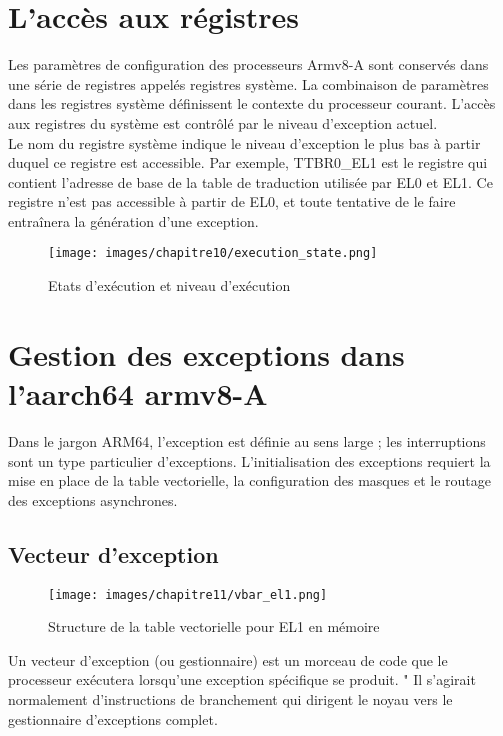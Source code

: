 \documentclass[12pt,a4paper,oneside]{book}
\begin{document}
	
	\section{L'accès aux régistres}
	
	Les paramètres de configuration des processeurs Armv8-A sont conservés dans une série de registres appelés registres système. La combinaison de paramètres dans les registres système définissent le contexte du processeur courant. L'accès aux registres du système est contrôlé par le niveau d'exception actuel. \\
	
	Le nom du registre système indique le niveau d'exception le plus bas à partir duquel ce registre est accessible. Par exemple, TTBR0\_EL1 est le registre qui contient l'adresse de base de la table de traduction utilisée par EL0 et EL1. Ce registre n'est pas accessible à partir de EL0, et toute tentative de le faire entraînera la génération d'une exception.
	
	\begin{figure}[H]
		\centering
		\texttt{[image: images/chapitre10/execution\_state.png]}
		\caption{Etats d'exécution et niveau d'exécution}
		\label{Types}
	\end{figure}
	
	
	
	\section{Gestion des exceptions dans l'aarch64 armv8-A}
	Dans le jargon ARM64, l'exception est définie au sens large ; les interruptions sont un type particulier d'exceptions. L'initialisation des exceptions requiert la mise en place de la table vectorielle, la configuration des masques et le routage des exceptions asynchrones.
	
	\subsection{Vecteur d'exception}
	\begin{figure}[H]
		\centering
		\texttt{[image: images/chapitre11/vbar\_el1.png]}
		\caption{Structure de la table vectorielle pour EL1 en mémoire}
		\label{Types}
	\end{figure}
	Un vecteur d'exception (ou gestionnaire) est un morceau de code que le processeur exécutera lorsqu'une exception spécifique se produit. " Il s'agirait normalement d'instructions de branchement qui dirigent le noyau vers le gestionnaire d'exceptions complet.\\
	
\end{document}
